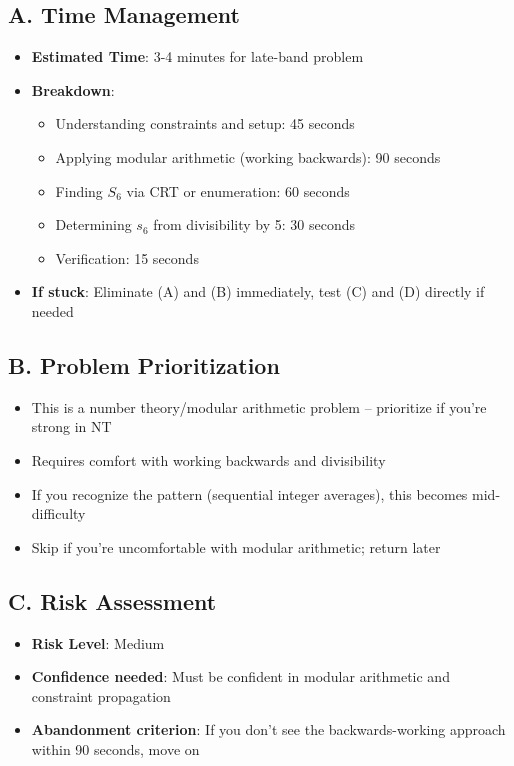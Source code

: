 \documentclass[11pt]{article}
\begin{document}
\begin{competitionbox}
\subsection*{A. Time Management}
\begin{itemize}[leftmargin=*]
    \item \textbf{Estimated Time}: 3-4 minutes for late-band problem
    \item \textbf{Breakdown}:
    \begin{itemize}
        \item Understanding constraints and setup: 45 seconds
        \item Applying modular arithmetic (working backwards): 90 seconds
        \item Finding $S_6$ via CRT or enumeration: 60 seconds
        \item Determining $s_6$ from divisibility by 5: 30 seconds
        \item Verification: 15 seconds
    \end{itemize}
    \item \textbf{If stuck}: Eliminate (A) and (B) immediately, test (C) and (D) directly if needed
\end{itemize}

\subsection*{B. Problem Prioritization}
\begin{itemize}[leftmargin=*]
    \item This is a number theory/modular arithmetic problem -- prioritize if you're strong in NT
    \item Requires comfort with working backwards and divisibility
    \item If you recognize the pattern (sequential integer averages), this becomes mid-difficulty
    \item Skip if you're uncomfortable with modular arithmetic; return later
\end{itemize}

\subsection*{C. Risk Assessment}
\begin{itemize}[leftmargin=*]
    \item \textbf{Risk Level}: Medium
    \item \textbf{Confidence needed}: Must be confident in modular arithmetic and constraint propagation
    \item \textbf{Abandonment criterion}: If you don't see the backwards-working approach within 90 seconds, move on
\end{itemize}


\end{competitionbox}
\end{document}
